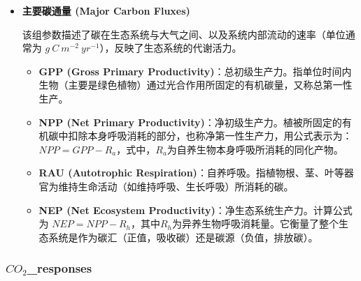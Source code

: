 \documentclass[10pt]{config}
\begin{document}
\begin{itemize}
    该组参数（无量纲，范围 0-1）反映了植物将光合产物 (NPP) 分配给不同器官的策略，体现了植物对环境限制因子的响应。
    \begin{itemize}
        \item \textbf{leaf}：光合产物分配给叶片的比例。%
        \item \textbf{root}：光合产物分配给细根的比例。%
        \item \textbf{wood}：光合产物分配给茎干（木质部）的比例。%
        \item \textbf{exudation}：光合产物分配给根系分泌物的比例。%
    \end{itemize}

    \item \textbf{主要碳通量 (Major Carbon Fluxes)}
    
    该组参数描述了碳在生态系统与大气之间、以及系统内部流动的速率（单位通常为 $g~C~m^{-2}~yr^{-1}$），反映了生态系统的代谢活力。
    \begin{itemize}
        \item \textbf{GPP (Gross Primary Productivity)}：总初级生产力。指单位时间内生物（主要是绿色植物）通过光合作用所固定的有机碳量，又称总第一性生产。
        \item \textbf{NPP (Net Primary Productivity)}：净初级生产力。植被所固定的有机碳中扣除本身呼吸消耗的部分，也称净第一性生产力，用公式表示为： $NPP = GPP - R_a$，式中，$R_a$为自养生物本身呼吸所消耗的同化产物。
        \item \textbf{RAU (Autotrophic Respiration)}：自养呼吸。指植物根、茎、叶等器官为维持生命活动（如维持呼吸、生长呼吸）所消耗的碳。
        \item \textbf{NEP (Net Ecosystem Productivity)}：净生态系统生产力。计算公式为 $NEP = NPP - R_h$，其中$R_h$为异养生物呼吸消耗量。它衡量了整个生态系统是作为碳汇（正值，吸收碳）还是碳源（负值，排放碳）。
    \end{itemize}
\end{itemize}

\newpage

\subsubsection{$CO_2$\_responses}
\end{document}
